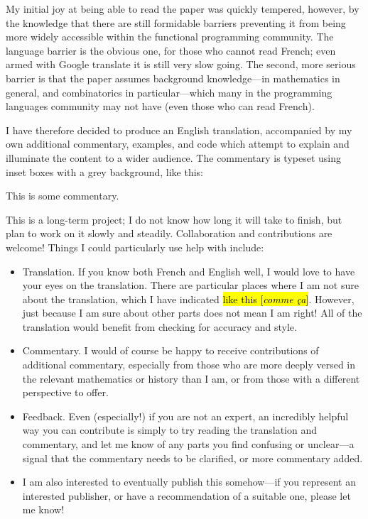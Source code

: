 \documentclass{amsart}
\theoremstyle{definition}
\theoremstyle{remark}
\newcommand{\trans}[2]{\hl{#1 [\textit{#2}]}}
\begin{document}
My initial joy at being able to read the paper was quickly tempered,
however, by the knowledge that there are still formidable barriers
preventing it from being more widely accessible within the functional
programming community. The language barrier is the obvious one, for
those who cannot read French; even armed with Google translate it is
still very slow going.  The second, more serious barrier is that the
paper assumes background knowledge---in mathematics in general, and
combinatorics in particular---which many in the programming languages
community may not have (even those who can read French).

I have therefore decided to produce an English translation,
accompanied by my own additional commentary, examples, and code which
attempt to explain and illuminate the content to a wider audience.
The commentary is typeset using inset boxes with a grey background,
like this:
\begin{commentary}
  This is some commentary.
\end{commentary}

This is a long-term project; I do not know how long it will take to
finish, but plan to work on it slowly and steadily.  Collaboration and
contributions are welcome!  Things I could
particularly use help with include:
\begin{itemize}
\item Translation.  If you know both French and English well, I would
  love to have your eyes on the translation.  There are particular
  places where I am not sure about the translation, which I have
  indicated \trans{like this}{comme \c{c}a}.  However, just because I
  am sure about other parts does not mean I am right! All of the
  translation would benefit from checking for accuracy and style.
\item Commentary. I would of course be happy to receive contributions
  of additional commentary, especially from those who are more deeply
  versed in the relevant mathematics or history than I am, or from
  those with a different perspective to offer.
\item Feedback. Even (especially!) if you are not an expert, an
  incredibly helpful way you can contribute is simply to try reading
  the translation and commentary, and let me know of any parts you
  find confusing or unclear---a signal that the commentary needs to be
  clarified, or more commentary added.
\item I am also interested to eventually publish this somehow---if you
  represent an interested publisher, or have a recommendation of a
  suitable one, please let me know!
\end{itemize}
\end{document}
